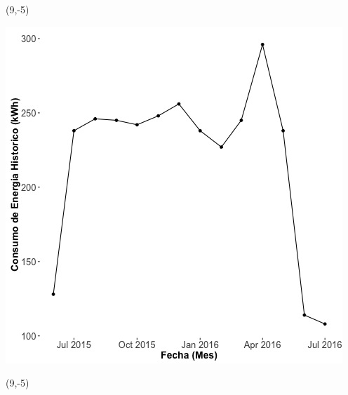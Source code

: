 \documentclass{article}\usepackage[]{graphicx}\usepackage[]{color}
\newenvironment{knitrout}{}{} %
\begin{document}
 \begin{textblock}{1}(9,-5)
\begin{minipage}{20em}
\begingroup

\endgroup
\end{minipage}
\end{textblock}

\begin{knitrout}
\color{fgcolor}
\includegraphics[scale=0.65]{figure/A28_historico_energia} 
\end{knitrout}

 \begin{textblock}{1}(9,-5)
\begin{minipage}{20em}
\begingroup

\endgroup
\end{minipage}
\end{textblock}
\end{document}
